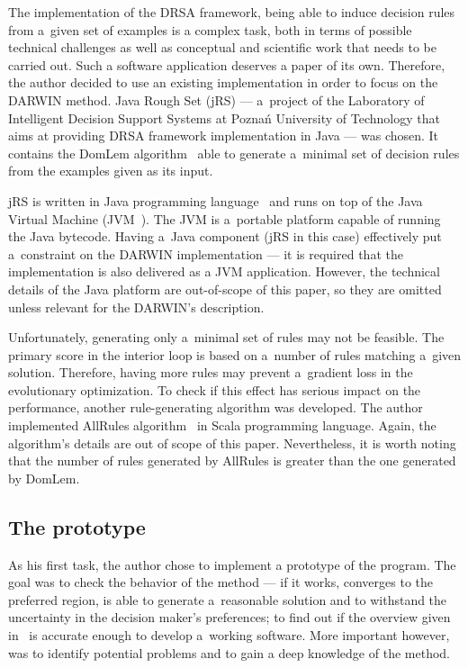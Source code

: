 The implementation of the DRSA framework, being able to induce decision rules
from a~given set of examples is a complex task, both in terms of possible
technical challenges as well as conceptual and scientific work that needs to
be carried out. Such a software application deserves a paper of its
own. Therefore, the author decided to use an existing implementation in order
to focus on the DARWIN method. Java Rough Set (jRS) --- a~project of the
Laboratory of Intelligent Decision Support Systems at Poznań University of
Technology that aims at providing DRSA framework implementation in Java ---
was chosen. It contains the DomLem algorithm~\cite{GMS+01} able to generate
a~minimal set of decision rules from the examples given as its input.

jRS is written in Java programming language~\cite{Jav} and runs on top of the
Java Virtual Machine (JVM~\cite{LY99}). The JVM is a~portable platform capable
of running the Java bytecode. Having a~Java component (jRS in this case)
effectively put a~constraint on the DARWIN implementation --- it is required
that the implementation is also delivered as a JVM application. However, the
technical details of the Java platform are out-of-scope of this paper, so they
are omitted unless relevant for the DARWIN's description.

Unfortunately, generating only a~minimal set of rules may not be feasible. The
primary score in the interior loop is based on a~number of rules matching
a~given solution. Therefore, having more rules may prevent a~gradient loss in
the evolutionary optimization. To check if this effect has serious impact on
the performance, another rule-generating algorithm was developed. The author
implemented AllRules algorithm~\cite{GMS+01b} in Scala programming
language. Again, the algorithm's details are out of scope of this
paper. Nevertheless, it is worth noting that the number of rules generated by
AllRules is greater than the one generated by DomLem.

\subsection{The prototype}

As his first task, the author chose to implement a prototype of the
program. The goal was to check the behavior of the method --- if it works,
converges to the preferred region, is able to generate a~reasonable solution
and to withstand the uncertainty in the decision maker's preferences; to find
out if the overview given in~\cite{GMS10, GMS10b, GMS10c} is accurate enough
to develop a~working software. More important however, was to identify
potential problems and to gain a deep knowledge of the method.

